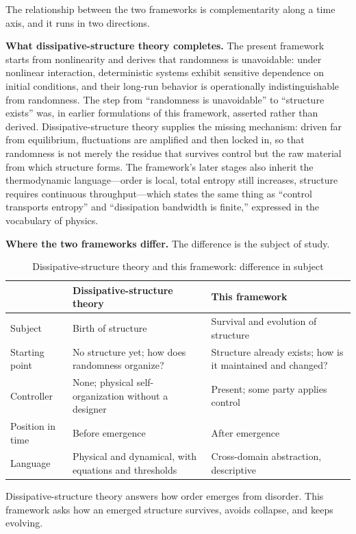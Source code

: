 \documentclass[11pt,a4paper]{article}
\begin{document}
The relationship between the two frameworks is complementarity along a time axis, and it runs in two directions.

\textbf{What dissipative-structure theory completes.} The present framework starts from nonlinearity and derives that randomness is unavoidable: under nonlinear interaction, deterministic systems exhibit sensitive dependence on initial conditions, and their long-run behavior is operationally indistinguishable from randomness. The step from ``randomness is unavoidable'' to ``structure exists'' was, in earlier formulations of this framework, asserted rather than derived. Dissipative-structure theory supplies the missing mechanism: driven far from equilibrium, fluctuations are amplified and then locked in, so that randomness is not merely the residue that survives control but the raw material from which structure forms. The framework's later stages also inherit the thermodynamic language---order is local, total entropy still increases, structure requires continuous throughput---which states the same thing as ``control transports entropy'' and ``dissipation bandwidth is finite,'' expressed in the vocabulary of physics.

\textbf{Where the two frameworks differ.} The difference is the subject of study.

\begin{table}[h]
\centering
\small
\caption{Dissipative-structure theory and this framework: difference in subject}
\begin{tabular}{p{2.6cm} p{5.6cm} p{5.4cm}}
\hline
& \textbf{Dissipative-structure theory} & \textbf{This framework} \\
\hline
Subject & Birth of structure & Survival and evolution of structure \\
Starting point & No structure yet; how does randomness organize? & Structure already exists; how is it maintained and changed? \\
Controller & None; physical self-organization without a designer & Present; some party applies control \\
Position in time & Before emergence & After emergence \\
Language & Physical and dynamical, with equations and thresholds & Cross-domain abstraction, descriptive \\
\hline
\end{tabular}
\end{table}

Dissipative-structure theory answers how order emerges from disorder. This framework asks how an emerged structure survives, avoids collapse, and keeps evolving.
\end{document}
